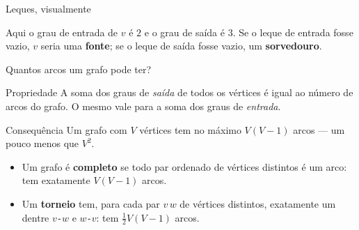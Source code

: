 \documentclass[aspectratio=169]{beamer}
\begin{document}
\begin{frame}{Leques, visualmente}
  \begin{center}
  \end{center}
  {\small Aqui o grau de entrada de $v$ é $2$ e o grau de saída é $3$.
  Se o leque de entrada fosse vazio, $v$ seria uma \textbf{fonte};
  se o leque de saída fosse vazio, um \textbf{sorvedouro}.}
\end{frame}

\begin{frame}{Quantos arcos um grafo pode ter?}
  \begin{block}{Propriedade}
    {\small A soma dos graus de \emph{saída} de todos os vértices é igual ao
    número de arcos do grafo. O mesmo vale para a soma dos graus de
    \emph{entrada}.}
  \end{block}
  \begin{alertblock}{Consequência}
    {\small Um grafo com $V$ vértices tem no máximo $V(V-1)$ arcos ---
    um pouco menos que $V^2$.}
  \end{alertblock}
  {\small
  \begin{itemize}\small
    \item Um grafo é \textbf{completo} se todo par ordenado de vértices
          distintos é um arco: tem exatamente $V(V-1)$ arcos.
    \item Um \textbf{torneio} tem, para cada par $v\,w$ de vértices distintos,
          exatamente um dentre $v$\texttt{-}$w$ e $w$\texttt{-}$v$:
          tem $\tfrac{1}{2}V(V-1)$ arcos.
  \end{itemize}}
\end{frame}
\end{document}
